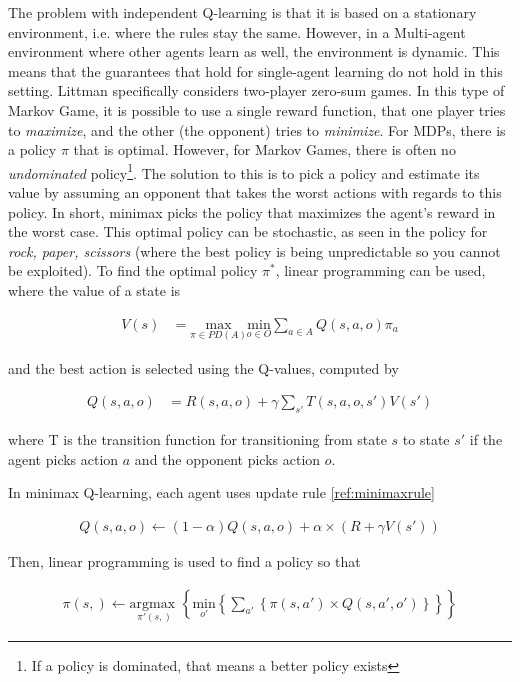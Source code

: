 The problem with independent Q-learning is that it is based on a stationary environment, i.e. where the rules stay the same. However, in a Multi-agent environment where other agents learn as well, the environment is dynamic. This means that the guarantees that hold for single-agent learning do not hold in this setting. Littman \cite{Littman94markovgames} specifically considers two-player zero-sum games. In this type of Markov Game, it is possible to use a single reward function, that one player tries to \textit{maximize}, and the other (the opponent) tries to \textit{minimize}. For MDPs, there is a policy $\pi$ that is optimal. However, for Markov Games, there is often no \textit{undominated} policy\footnote{If a policy is dominated, that means a better policy exists}. The solution to this is to pick a policy and estimate its value by assuming an opponent that takes the worst actions with regards to this policy. In short, minimax picks the policy that maximizes the agent's reward in the worst case. This optimal policy can be stochastic, as seen in the policy for \textit{rock, paper, scissors} (where the best policy is being unpredictable so you cannot be exploited). To find the optimal policy $\pi^*$, linear programming can be used, where the value of a state is
\begin{mdframed}
\begin{align}
V(s) &= \underset{\pi \in PD(A)}{\text{max}} \underset{o \in O}{\text{min}} \sum_{a\in A} Q(s,a,o) \pi_a
\end{align}
\end{mdframed}
and the best action is selected using the Q-values, computed by
\begin{mdframed}
\begin{align}
Q(s,a,o) &= R(s,a,o) + \gamma \sum_{s'} T(s,a,o,s') V(s')
\end{align}
\end{mdframed}
where T is the transition function for transitioning from state $s$ to state $s'$ if the agent picks action $a$ and the opponent picks action $o$.

In minimax Q-learning, each agent uses update rule \ref{ref:minimaxrule}
\begin{mdframed}
\begin{align}
Q(s,a,o) \leftarrow (1-\alpha) Q(s,a,o) + \alpha \times (R + \gamma V(s'))
\end{align}
\label{ref:minimaxrule}
\end{mdframed}
Then, linear programming is used to find a policy so that
\begin{mdframed}
\begin{align}
\pi(s,) \leftarrow \underset{\pi'(s,)}{\text{argmax }} \left\{ \underset{o'}{\text{min}} \left\{ \sum_{a'}  \left\{ \pi(s,a') \times Q(s,a',o') \right\} \right\} \right\}
\end{align}
\end{mdframed}



